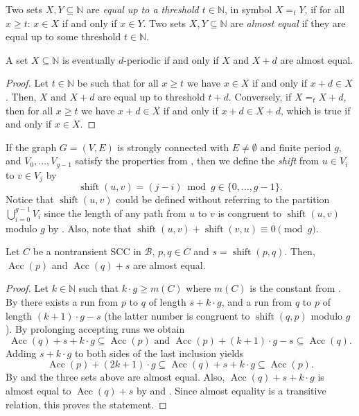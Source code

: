 \documentclass{article}\usepackage[a4paper,margin=20mm]{geometry}
\newcommand{\N}{\mathbb{N}}
\newcommand{\B}{\mathcal{B}}
\DeclareMathOperator{\shift}{shift}
\DeclareMathOperator{\Acc}{Acc}
\renewcommand{\geq}{\geqslant}
\renewcommand{\ge}{\geq}
\begin{document}
Two sets $X,Y \subseteq \N$ are {\em equal up to a threshold $t \in \N$}, in symbol $X =_t Y$, if for all $x \geq t$:
$x \in X$ if and only if $x \in Y$. Two sets $X,Y \subseteq \N$ are {\em almost equal} if they are equal up to some threshold $t \in \N$. 

\begin{lemma}
	\label{lem:ae}
	A set $X \subseteq \N$ is eventually $d$-periodic if and only if $X$ and $X+d$ are almost equal.
\end{lemma}
\begin{proof}
Let $t \in \N$ be such that for all $x \ge t$ we have $x \in X$ if and only if $x + d \in X$. Then, $X$ and $X + d$ are equal up to threshold $t+d$. Conversely, if $X =_t X+d$, then for all $x \ge t$ we have $x + d \in X$ if and only if $x + d \in X+d$, which is true if and only if $x \in X$.
\end{proof}

If the graph $G = (V,E)$ is strongly connected with $E \neq \emptyset$ and finite period $g$,
and $V_0, \ldots, V_{g-1}$ satisfy the properties from , then
we define the {\em shift} from $u \in V_i$ to $v \in V_j$
by
\begin{equation}\label{shift}
\shift(u,v) = (j-i) \bmod g \in \{0, \dots, g-1\}.
\end{equation}
Notice that $\shift(u,v)$ could be defined without referring to the partition $\bigcup_{i=0}^{g-1} V_i$ 
since the length of any path from $u$ to $v$ is congruent to $\shift(u,v)$ modulo $g$
by .  Also, note that $\shift(u,v) + \shift(v,u) \equiv 0 \pmod g$.

\begin{lemma}
\label{lem:con-run}
Let $C$ be a nontransient SCC in $\B$, $p,q \in C$ and $s = \shift(p,q)$.
Then, $\Acc(p)$ and $\Acc(q) + s$ are almost equal.
\end{lemma}

\begin{proof}
	Let $k \in \N$ such that $k \cdot g \ge m(C)$ where $m(C)$ is the constant from .
	By  there exists a run from $p$ to $q$ of length $s + k \cdot g$,
	and a run from $q$ to $p$ of length $(k+1) \cdot g - s$ (the latter number is congruent 
	to $\shift(q,p)$ modulo $g$).
	By prolonging accepting runs we obtain
	\[
		\Acc(q) + s + k \cdot g \subseteq \Acc(p) \mbox{ and } \Acc(p) + (k+1) \cdot g - s \subseteq \Acc(q).
	\]
	Adding $s + k \cdot g$ to both sides of the last inclusion yields
	\[
		\Acc(p) + (2k+1) \cdot g \subseteq \Acc(q) + s + k \cdot g \subseteq \Acc(p).
	\]
	By  and  the three sets above are almost equal.
	Also, $\Acc(q) + s + k \cdot g$ is almost equal to $\Acc(q) + s$
	by  and . Since almost equality is a transitive relation,
	this proves the statement.
\end{proof}
\end{document}
